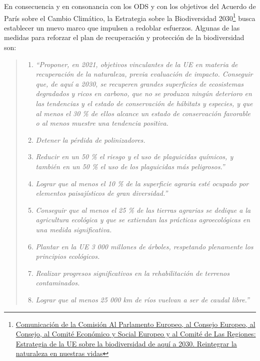 \documentclass[a4paper, nobind]{templates/ociamthesis}
\begin{document}
En consecuencia y en consonancia con los ODS y con los objetivos del
Acuerdo de París sobre el Cambio Climático, la Estrategia sobre la
Biodiversidad 2030\footnote{\href{https://eur-lex.europa.eu/legal-content/ES/TXT/?uri=celex\%3A52020DC0380}{Comunicación de la Comisión Al Parlamento
  Europeo, al Consejo Europeo, al Consejo, al Comité Económico y
  Social Europeo y al Comité de Las Regiones: Estrategia de la UE
  sobre la biodiversidad de aquí a 2030. Reintegrar la naturaleza en
  nuestras
  vidas}} busca establecer un nuevo marco
que impulsen a redoblar esfuerzos. Algunas de las medidas para reforzar
el plan de recuperación y protección de la biodiversidad son:

\begin{quote}
\begin{enumerate}
\def\labelenumi{\arabic{enumi}.}
\item
  \emph{``Proponer, en 2021, objetivos vinculantes de la UE en materia de
  recuperación de la naturaleza, previa evaluación de impacto.
  Conseguir que, de aquí a 2030, se recuperen grandes superficies de
  ecosistemas degradados y ricos en carbono, que no se produzca
  ningún deterioro en las tendencias y el estado de conservación de
  hábitats y especies, y que al menos el 30 \% de ellos alcance un
  estado de conservación favorable o al menos muestre una tendencia
  positiva.}
\item
  \emph{Detener la pérdida de polinizadores.}
\item
  \emph{Reducir en un 50 \% el riesgo y el uso de plaguicidas químicos, y
  también en un 50 \% el uso de los plaguicidas más peligrosos.''}
\item
  \emph{Lograr que al menos el 10 \% de la superficie agraria esté ocupado
  por elementos paisajísticos de gran diversidad.''}
\item
  \emph{Conseguir que al menos el 25 \% de las tierras agrarias se dedique
  a la agricultura ecológica y que se extiendan las prácticas
  agroecológicas en una medida significativa.}
\item
  \emph{Plantar en la UE 3 000 millones de árboles, respetando plenamente
  los principios ecológicos.}
\item
  \emph{Realizar progresos significativos en la rehabilitación de
  terrenos contaminados.}
\item
  \emph{Lograr que al menos 25 000 km de ríos vuelvan a ser de caudal
  libre.''}
\end{enumerate}
\end{quote}
\end{document}

